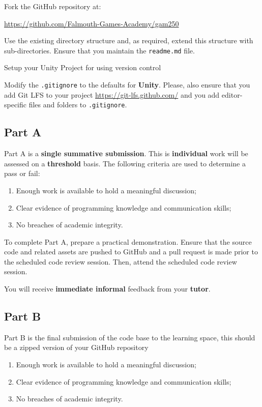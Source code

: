 \documentclass{../../fal_assignment}
\begin{document}
Fork the GitHub repository at:

\indent \url{https://github.com/Falmouth-Games-Academy/gam250}

Use the existing directory structure and, as required, extend this structure with sub-directories. Ensure that you maintain the \texttt{readme.md} file.

Setup your Unity Project for using version control \url{}

Modify the \texttt{.gitignore} to the defaults for \textbf{Unity}. Please, also ensure that you add Git LFS to your project \url{https://git-lfs.github.com/} and you add editor-specific files and folders to \texttt{.gitignore}.  

\subsection*{Part A}

Part A is a \textbf{single summative submission}. This is \textbf{individual} work will be assessed on a \textbf{threshold} basis. The following criteria are used to determine a pass or fail: 

\begin{enumerate}[label=(\alph*)]
	\item Enough work is available to hold a meaningful discussion; 
	\item Clear evidence of programming knowledge and communication skills; 
	\item No breaches of academic integrity. 
\end{enumerate}

To complete Part A, prepare a practical demonstration. Ensure that the source code and related assets are pushed to GitHub and a pull request is made prior to the scheduled code review session. Then, attend the scheduled code review session. 

You will receive \textbf{immediate informal} feedback from your \textbf{tutor}.

\subsection*{Part B}

Part B is the final submission of the code base to the learning space, this should be a zipped version of your GitHub repository

\begin{enumerate}[label=(\alph*)]
	\item Enough work is available to hold a meaningful discussion; 
	\item Clear evidence of programming knowledge and communication skills; 
	\item No breaches of academic integrity. 
\end{enumerate}
\end{document}
